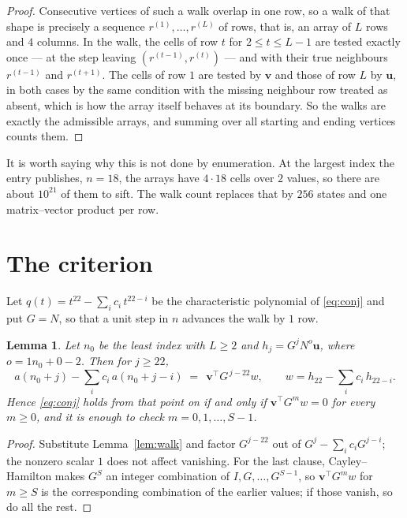 \documentclass[11pt,a4paper]{article}
\theoremstyle{plain}
\newtheorem{lemma}[theorem]{Lemma}
\theoremstyle{definition}
\begin{document}
\begin{proof}
Consecutive vertices of such a walk overlap in one row, so a walk of that shape is
precisely a sequence $r^{(1)},\dots,r^{(L)}$ of rows, that is, an array of $L$ rows
and $4$ columns. In the walk, the cells of row $t$ for $2\le t\le L-1$ are tested
exactly once --- at the step leaving $(r^{(t-1)},r^{(t)})$ --- and with their true
neighbours $r^{(t-1)}$ and $r^{(t+1)}$. The cells of row $1$ are tested by
$\mathbf{v}$ and those of row $L$ by $\mathbf{u}$, in both cases by the same condition
with the missing neighbour row treated as absent, which is how the array itself behaves at
its boundary. So the walks are exactly the admissible arrays, and summing over all starting
and ending vertices counts them.
\end{proof}


It is worth saying why this is not done by enumeration. At the largest index the entry
publishes, $n=18$, the arrays have $4\cdot18$ cells over
$2$ values, so there are about $10^{21}$ of them to sift. The
walk count replaces that by $256$ states and one matrix--vector product per row.
\section{The criterion}

Let $q(t)=t^{22}-\sum_i c_i\,t^{22-i}$ be the characteristic polynomial of
\eqref{eq:conj} and put $G=N$, so that a unit step in $n$ advances the walk by
$1$ row.

\begin{lemma}\label{lem:crit}
Let $n_0$ be the least index with $L\ge2$ and $h_j=G^{j}N^{o}\mathbf{u}$, where
$o=1n_0+0-2$. Then for $j\ge22$,
\[
a(n_0+j)-\sum_i c_i\,a(n_0+j-i)\;=\;\,\mathbf{v}^{\!\top}G^{\,j-22}w,
\qquad w=h_{22}-\sum_i c_i\,h_{22-i} .
\]
Hence \eqref{eq:conj} holds from that point on if and only if
$\mathbf{v}^{\!\top}G^{m}w=0$ for every $m\ge0$, and it is enough to check
$m=0,1,\dots,S-1$.
\end{lemma}

\begin{proof}
Substitute Lemma~\ref{lem:walk} and factor $G^{j-22}$ out of
$G^{j}-\sum_ic_iG^{j-i}$; the nonzero scalar $1$ does not affect
vanishing. For the last clause, Cayley--Hamilton makes $G^{S}$ an integer combination of
$I,G,\dots,G^{S-1}$, so $\mathbf{v}^{\!\top}G^{m}w$ for $m\ge S$ is the corresponding
combination of the earlier values; if those vanish, so do all the rest.
\end{proof}
\end{document}
